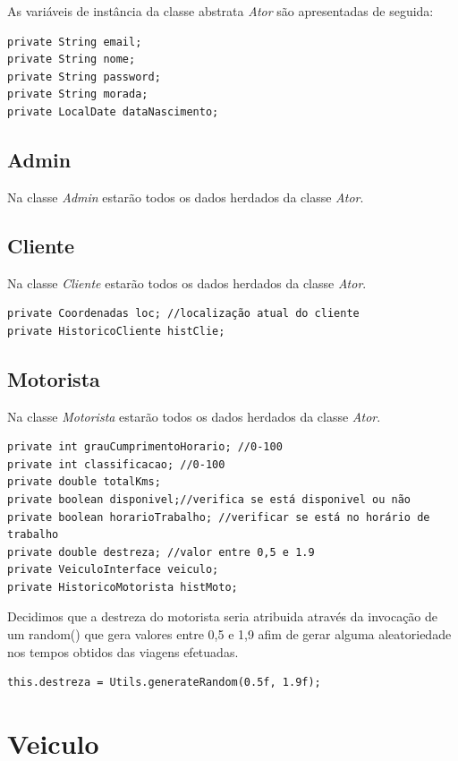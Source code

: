 As variáveis de instância da classe abstrata \textit{Ator} são apresentadas de seguida: 
\begin{verbatim}
private String email; 
private String nome; 
private String password; 
private String morada; 
private LocalDate dataNascimento; 
\end{verbatim}


\subsection{Admin}

Na classe \textit{Admin} estarão todos os dados herdados da classe \textit{Ator}. 


\subsection{Cliente}
Na classe \textit{Cliente} estarão todos os dados herdados da classe \textit{Ator}. 

\begin{verbatim}
private Coordenadas loc; //localização atual do cliente
private HistoricoCliente histClie; 
\end{verbatim}
\subsection{Motorista}
Na classe \textit{Motorista} estarão todos os dados herdados da classe \textit{Ator}. 

\begin{verbatim}
private int grauCumprimentoHorario; //0-100
private int classificacao; //0-100
private double totalKms; 
private boolean disponivel;//verifica se está disponivel ou não 
private boolean horarioTrabalho; //verificar se está no horário de trabalho
private double destreza; //valor entre 0,5 e 1.9
private VeiculoInterface veiculo; 
private HistoricoMotorista histMoto; 
\end{verbatim}

Decidimos que a destreza do motorista seria atribuida através da invocação de um random() que gera valores entre 0,5  e 1,9 afim de gerar alguma aleatoriedade nos tempos obtidos das viagens efetuadas. 
\begin{verbatim}
this.destreza = Utils.generateRandom(0.5f, 1.9f); 
\end{verbatim}

\newpage
\section{Veiculo}

